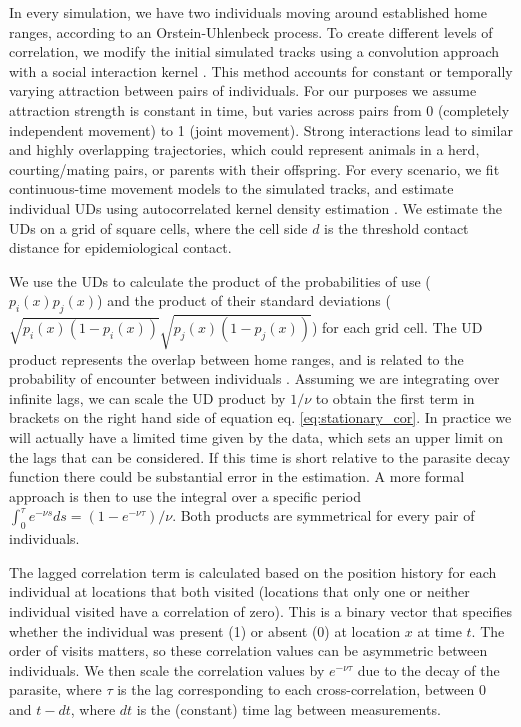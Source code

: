 \documentclass[letterpaper]{article}
\begin{document}
In every simulation, we have two individuals moving around established home ranges, according to an Orstein-Uhlenbeck process. To create different levels of correlation, we modify the initial simulated tracks using a convolution approach with a social interaction kernel \citep{Scharf2018}. This method accounts for constant or temporally varying attraction between pairs of individuals. For our purposes we assume attraction strength is constant in time, but varies across pairs from 0 (completely independent movement) to 1 (joint movement). Strong interactions lead to similar and highly overlapping trajectories, which could represent animals in a herd, courting/mating pairs, or parents with their offspring.
For every scenario, we fit continuous-time movement models to the simulated tracks, and estimate individual UDs using autocorrelated kernel density estimation \citep{Calabrese2016}. We estimate the UDs on a grid of square cells, where the cell side $d$ is the threshold contact distance for epidemiological contact. 

We use the UDs to calculate the product of the probabilities of use ($p_i(x)p_j(x)$) and the product of their standard deviations ($\sqrt{p_i(x)(1-p_i(x))}\sqrt{p_j(x)(1-p_j(x))}$) for each grid cell.
The UD product represents the overlap between home ranges, and is related to the probability of encounter between individuals \citep{Noonan2021}. Assuming we are integrating over infinite lags, we can scale the UD product by $1/\nu$ to obtain the first term in brackets on the right hand side of equation eq. \ref{eq:stationary_cor}. In practice we will actually have a limited time given by the data, which sets an upper limit on the lags that can be considered. If this time is short relative to the parasite decay function there could be substantial error in the estimation. A more formal approach is then to use the integral over a specific period  $\int_0^{\tau} e^{-\nu s}ds=(1-e^{-\nu\tau})/\nu$.
 Both products are symmetrical for every pair of individuals. 

The lagged correlation term is calculated based on the position history for each individual at locations that both visited (locations that only one or neither individual visited have a correlation of zero). This is a binary vector that specifies whether the individual was present (1) or absent (0) at location $x$ at time $t$. 
The order of visits matters, so these correlation values can be asymmetric between individuals. 
We then scale the correlation values by $e^{-\nu\tau}$ due to the decay of the parasite, where $\tau$ is the lag corresponding to each cross-correlation, between 0 and $t-dt$, where $dt$ is the (constant) time lag between measurements. 
\end{document}
